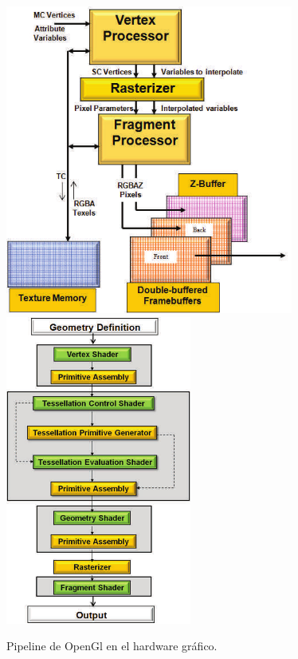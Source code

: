 \begin{figure}[h]%

	\begin{center}
	    \includegraphics[height=4in]{figures/pipeline.png}
	    \includegraphics[height=4in]{figures/pipelineExtendido.png}
	\end{center}

    \caption[Pipeline de OpenGl]{Pipeline de OpenGl en el hardware gráfico.}
	\label{figurePipeline}

\end{figure}



